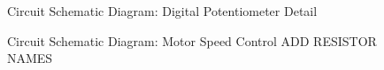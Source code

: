 \documentclass[a4]{report}
\begin{document}
	\begin{figure}[!htb]
		\centering
		\caption{Circuit Schematic Diagram: Digital Potentiometer Detail}
		\label{circdigpotclose}
	\end{figure} \newline  \noindent
	\begin{figure}[!htb]
		\centering
		\caption{Circuit Schematic Diagram: Motor Speed Control ADD RESISTOR NAMES}
		\label{circspeedcontr}
	\end{figure} \newline  \noindent
\end{document}
